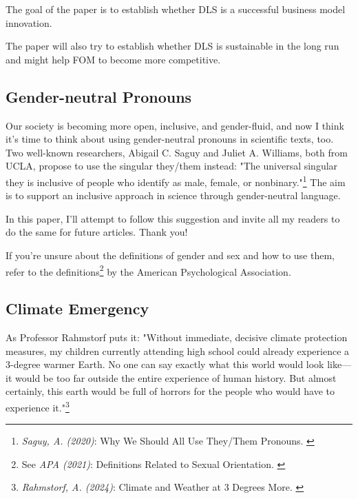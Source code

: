 The goal of the paper is to establish whether DLS is a successful business model innovation.

The paper will also try to establish whether DLS is sustainable in the long run and might help FOM to become more competitive.

\subsection{Gender-neutral Pronouns}

Our society is becoming more open, inclusive, and gender-fluid, and now I think it's time to think about using gender-neutral pronouns in scientific texts, too. Two well-known researchers, Abigail C. Saguy and Juliet A. Williams, both from UCLA, propose to use the singular they/them instead: "The universal singular they is inclusive of people who identify as male, female, or nonbinary."\footnote{\textit{Saguy, A. (2020)}: Why We Should All Use They/Them Pronouns. \cite{pronouns}} The aim is to support an inclusive approach in science through gender-neutral language. 

In this paper, I'll attempt to follow this suggestion and invite all my readers to do the same for future articles. Thank you!

If you're unsure about the definitions of gender and sex and how to use them, refer to the definitions\footnote{See \textit{APA (2021)}: Definitions Related to Sexual Orientation. \cite{apaDefinitions}} by the American Psychological Association.

\subsection{Climate Emergency}

As Professor Rahmstorf puts it: "Without immediate, decisive climate protection measures, my children currently attending high school could already experience a 3-degree warmer Earth. No one can say exactly what this world would look like—it would be too far outside the entire experience of human history. But almost certainly, this earth would be full of horrors for the people who would have to experience it."\footnote{\textit{Rahmstorf, A. (2024)}: Climate and Weather at 3 Degrees More. \cite{3dgreesMore}}
